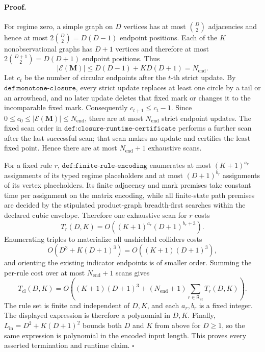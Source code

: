 \paragraph{Proof.} For regime zero, a simple graph on \(D\) vertices has at most \(\binom D2\) adjacencies and hence at most \(2\binom D2=D(D-1)\) endpoint positions.  Each of the \(K\) nonobservational graphs has \(D+1\) vertices and therefore at most \(2\binom{D+1}{2}=D(D+1)\) endpoint positions.  Thus\[|\mathcal E(\mathbf M)|\le D(D-1)+KD(D+1)=N_{\mathrm{end}}.\]Let \(c_t\) be the number of circular endpoints after the \(t\)-th strict update.  By \(\texttt{def:monotone-closure}\), every strict update replaces at least one circle by a tail or an arrowhead, and no later update deletes that fixed mark or changes it to the incomparable fixed mark.  Consequently \(c_{t+1}\le c_t-1\).  Since \(0\le c_0\le |\mathcal E(\mathbf M)|\le N_{\mathrm{end}}\), there are at most \(N_{\mathrm{end}}\) strict endpoint updates.  The fixed scan order in \(\texttt{def:closure-runtime-certificate}\) performs a further scan after the last successful scan; that scan makes no update and certifies the least fixed point.  Hence there are at most \(N_{\mathrm{end}}+1\) exhaustive scans.

For a fixed rule \(r\), \(\texttt{def:finite-rule-encoding}\) enumerates at most \((K+1)^{a_r}\) assignments of its typed regime placeholders and at most \((D+1)^{b_r}\) assignments of its vertex placeholders.  Its finite adjacency and mark premises take constant time per assignment on the matrix encoding, while all finite-state path premises are decided by the stipulated product-graph breadth-first searches within the declared cubic envelope.  Therefore one exhaustive scan for \(r\) costs\[T_r(D,K)=O\!\left((K+1)^{a_r}(D+1)^{b_r+3}\right).\]Enumerating triples to materialize all unshielded colliders costs\[O\!\left(D^3+K(D+1)^3\right)=O\!\left((K+1)(D+1)^3\right),\]and orienting the existing indicator endpoints is of smaller order.  Summing the per-rule cost over at most \(N_{\mathrm{end}}+1\) scans gives\[T_{\mathrm{cl}}(D,K)=O\!\left((K+1)(D+1)^3+(N_{\mathrm{end}}+1)\sum_{r\in\mathsf R_{\mathrm{SI}}}T_r(D,K)\right).\]The rule set is finite and independent of \(D,K\), and each \(a_r,b_r\) is a fixed integer.  The displayed expression is therefore a polynomial in \(D,K\).  Finally, \(L_{\mathrm{in}}=D^2+K(D+1)^2\) bounds both \(D\) and \(K\) from above for \(D\ge1\), so the same expression is polynomial in the encoded input length.  This proves every asserted termination and runtime claim. \(\square\)